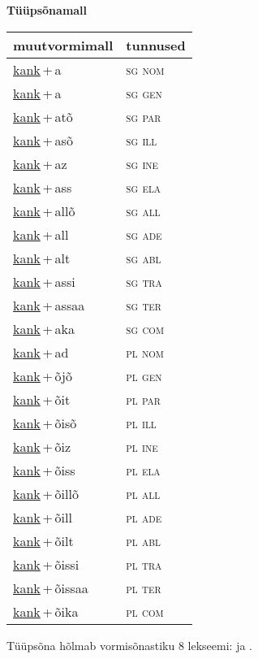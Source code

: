 
\vspace{1.8em}
\begin{minipage}{\textwidth}
\textbf{Tüüpsõnamall \,}\\

\begin{sideways}
\begin{tabular}{l l}
muutvormimall & tunnused \\
\hline
\underline{kank}\,+\,a & \textsc{ sg nom } \\
\underline{kank}\,+\,a & \textsc{ sg gen } \\
\underline{kank}\,+\,atõ & \textsc{ sg par } \\
\underline{kank}\,+\,asõ & \textsc{ sg ill } \\
\underline{kank}\,+\,az & \textsc{ sg ine } \\
\underline{kank}\,+\,ass & \textsc{ sg ela } \\
\underline{kank}\,+\,allõ & \textsc{ sg all } \\
\underline{kank}\,+\,all & \textsc{ sg ade } \\
\underline{kank}\,+\,alt & \textsc{ sg abl } \\
\underline{kank}\,+\,assi & \textsc{ sg tra } \\
\underline{kank}\,+\,assaa & \textsc{ sg ter } \\
\underline{kank}\,+\,aka & \textsc{ sg com } \\
\underline{kank}\,+\,ad & \textsc{ pl nom } \\
\underline{kank}\,+\,õjõ & \textsc{ pl gen } \\
\underline{kank}\,+\,õit & \textsc{ pl par } \\
\underline{kank}\,+\,õisõ & \textsc{ pl ill } \\
\underline{kank}\,+\,õiz & \textsc{ pl ine } \\
\underline{kank}\,+\,õiss & \textsc{ pl ela } \\
\underline{kank}\,+\,õillõ & \textsc{ pl all } \\
\underline{kank}\,+\,õill & \textsc{ pl ade } \\
\underline{kank}\,+\,õilt & \textsc{ pl abl } \\
\underline{kank}\,+\,õissi & \textsc{ pl tra } \\
\underline{kank}\,+\,õissaa & \textsc{ pl ter } \\
\underline{kank}\,+\,õika & \textsc{ pl com } \\
\end{tabular}
\end{sideways}
\label{tab:tüüpsõnamall-kanka}

\end{minipage}

 
\vspace{1em}
\noindent Tüüpsõna hõlmab vormisõnastiku 8 lekseemi:  ja .
